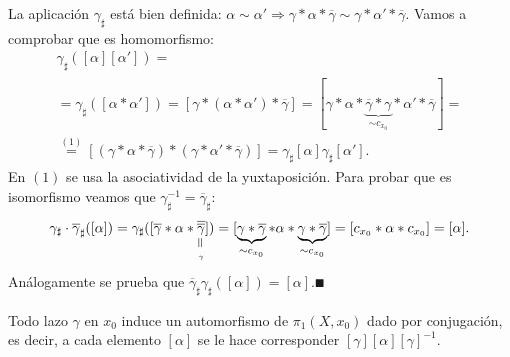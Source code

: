 \documentclass[GTS.tex]{subfiles}
\begin{document}
\begin{dem}
La aplicación $\gamma_\sharp$ está bien definida: $\alpha\sim\alpha'\Rightarrow\gamma*\alpha*\overline{\gamma}\sim\gamma*\alpha'*\overline{\gamma}$. Vamos a comprobar que es homomorfismo:
\begin{gather*}
\gamma_\sharp([\alpha][\alpha'])=\\
=\gamma_\sharp([\alpha*\alpha'])=[\gamma*(\alpha*\alpha')*\overline{\gamma}]=[\gamma*\alpha*\underbrace{\overline{\gamma}*\gamma}_{\sim c_{x_0}}*\alpha'*\overline{\gamma}]=\\
\overset{(1)}{=}[(\gamma*\alpha*\overline{\gamma})*(\gamma*\alpha'*\overline{\gamma})]
=\gamma_\sharp[\alpha]\gamma_\sharp[\alpha'].
\end{gather*}
En $(1)$ se usa la asociatividad de la yuxtaposición.
Para probar que es isomorfismo veamos que $\gamma^{-1}_\sharp=\overline{\gamma}_\sharp$:
\begin{gather*}
\gamma_\sharp\cdot\overline{\gamma}_\sharp([\alpha])=\gamma_\sharp([\overline{\gamma}*\alpha*\underset{\underset{\gamma}{\verteq}}{\overline{\overline{\gamma}}}])=[\underbrace{\gamma*\overline{\gamma}}_{\sim c_{x_0}}*\alpha*\underbrace{\gamma*\overline{\gamma}}_{\sim c_{x_0}}]=[c_{x_0}*\alpha*c_{x_0}]=[\alpha].
\end{gather*}
Análogamente se prueba que $\overline{\gamma}_\sharp\gamma_\sharp([\alpha])=[\alpha]$.$\QED$
\end{dem}

\begin{coro}
Todo lazo $\gamma$ en $x_0$ induce un automorfismo de $\pi_1(X,x_0)$ dado por conjugación, es decir, a cada elemento $[\alpha]$ se le hace corresponder $[\gamma][\alpha][\gamma]^{-1}$.
\end{coro}
\end{document}
